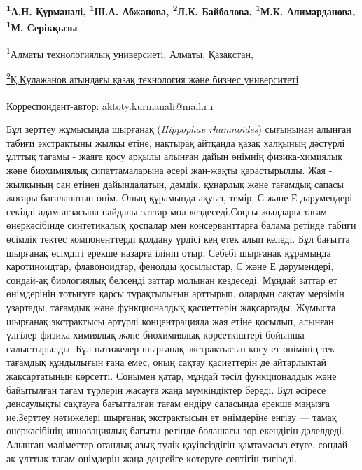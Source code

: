 
\begin{articleheader}

{\bfseries
\textsuperscript{1}А.Н. Құрманәлі\textsuperscript{\envelope},
\textsuperscript{1}Ш.А. Абжанова,
\textsuperscript{2}Л.К. Байболова,
\textsuperscript{1}М.К. Алимарданова,
\textsuperscript{1}М. Серікқызы
}
\end{articleheader}

\begin{affiliation}
\textsuperscript{1}Алматы технологиялық универсиеті, Алматы, Қазақстан,

\href{https://www.kaztbu.edu.kz/}{\textsuperscript{2}Қ.Құлажанов атындағы қазақ технология және бизнес университеті}

\raggedright \textsuperscript{\envelope }Корреспондент-автор: aktoty.kurmanali@mail.ru
\end{affiliation}

Бұл зерттеу жұмысында шырғанақ (\emph{Hippophae rhamnoides}) сығынынан
алынған табиғи экстрактыны жылқы етіне, нақтырақ айтқанда қазақ халқының
дәстүрлі ұлттық тағамы - жаяға қосу арқылы алынған дайын өнімнің
физика-химиялық және биохимиялық сипаттамаларына әсері жан-жақты
қарастырылды. Жая - жылқының сан етінен дайындалатын, дәмдік, құнарлық
және тағамдық сапасы жоғары бағаланатын өнім. Оның құрамында ақуыз,
темір, С және Е дәрумендері секілді адам ағзасына пайдалы заттар мол
кездеседі.Соңғы жылдары тағам өнеркәсібінде синтетикалық қоспалар мен
консерванттарға балама ретінде табиғи өсімдік тектес компоненттерді
қолдану үрдісі кең етек алып келеді. Бұл бағытта шырғанақ өсімдігі
ерекше назарға ілініп отыр. Себебі шырғанақ құрамында каротиноидтар,
флавоноидтар, фенолды қосылыстар, С және Е дәрумендері, сондай-ақ
биологиялық белсенді заттар молынан кездеседі. Мұндай заттар ет
өнімдерінің тотығуға қарсы тұрақтылығын арттырып, олардың сақтау
мерзімін ұзартады, тағамдық және функционалдық қасиеттерін жақсартады.
Жұмыста шырғанақ экстрактысы әртүрлі концентрацияда жая етіне қосылып,
алынған үлгілер физика-химиялық және биохимиялық көрсеткіштері бойынша
салыстырылды. Бұл нәтижелер шырғанақ экстрактысын қосу ет өнімінің тек
тағамдық құндылығын ғана емес, оның сақтау қасиеттерін де айтарлықтай
жақсартатынын көрсетті. Сонымен қатар, мұндай тәсіл функционалдық және
байытылған тағам түрлерін жасауға жаңа мүмкіндіктер береді. Бұл әсіресе
денсаулықты сақтауға бағытталған тағам өндіру саласында ерекше маңызға
ие.Зерттеу нәтижелері шырғанақ экстрактысын ет өнімдеріне енгізу ---
тамақ өнеркәсібінің инновациялық бағыты ретінде болашағы зор екендігін
дәлелдеді. Алынған мәліметтер отандық азық-түлік қауіпсіздігін
қамтамасыз етуге, сондай-ақ ұлттық тағам өнімдерін жаңа деңгейге
көтеруге септігін тигізеді.


